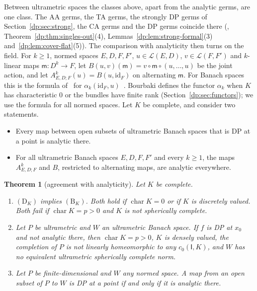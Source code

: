 \documentclass[11pt]{amsart}
\theoremstyle{definition}
\theoremstyle{remark}
\numberwithin{equation}{section}
\newcommand{\cL}{\mathcal L}
\newcommand{\id}{\mathrm{id}}
\theoremstyle{plain}
\newtheorem{introtheorem}{Theorem}
\theoremstyle{definition}
\theoremstyle{plain}
\begin{document}
Between ultrametric spaces the classes above, apart from the analytic germs, are one class. The AA germs, the TA germs, the strongly DP germs of Section~\ref{dp:sec:strong}, the CA germs and the DP germs coincide there (\cite[Theorem~14.39(1)]{I}, Theorem~\ref{dp:thm:singles-out}(4), Lemmas~\ref{dp:lem:strong-formal}(3) and~\ref{dp:lem:cover-flat}(5)). The comparison with analyticity then turns on the field. For $k\ge1$, normed spaces $E,D,F,F'$, $u\in\cL(E,D)$, $v\in\cL(F,F')$ and $k$-linear maps $\mathsf m\colon D^k\to F$, let $B(u,v)(\mathsf m)=v\circ\mathsf m\circ(u,\dots,u)$ be the joint action, and let $A^k_{E,D;F}(u)=B(u,\id_F)$ on alternating $\mathsf m$. For Banach spaces this is the formula of~\cite[n\textsuperscript{o}~7.8.1]{Bou} for $\alpha_k(\id_F,u)$~\cite[Section~10.2]{I}. Bourbaki defines the functor $\alpha_k$ when $K$ has characteristic $0$ or the bundles have finite rank (Section~\ref{dp:sec:functors}); we use the formula for all normed spaces. Let $K$ be complete, and consider two statements.
\begin{itemize}
\item[$(\mathrm D_K)$] Every map between open subsets of ultrametric Banach spaces that is DP at a point is analytic there.
\item[$(\mathrm B_K)$] For all ultrametric Banach spaces $E,D,F,F'$ and every $k\ge1$, the maps $A^k_{E,D;F}$ and $B$, restricted to alternating maps, are analytic everywhere.
\end{itemize}

\begin{introtheorem}[agreement with analyticity]\label{dp:intro:D}
Let $K$ be complete.
\begin{enumerate}
\item $(\mathrm D_K)$ implies $(\mathrm B_K)$. Both hold if $\operatorname{char}K=0$ or if $K$ is discretely valued. Both fail if $\operatorname{char}K=p>0$ and $K$ is not spherically complete.
\item Let $P$ be ultrametric and $W$ an ultrametric Banach space. If $f$ is DP at $x_0$ and not analytic there, then $\operatorname{char}K=p>0$, $K$ is densely valued, the completion of $P$ is not linearly homeomorphic to any $c_0(\mathsf I,K)$, and $W$ has no equivalent ultrametric spherically complete norm.
\item Let $P$ be finite-dimensional and $W$ any normed space. A map from an open subset of $P$ to $W$ is DP at a point if and only if it is analytic there.
\end{enumerate}
\end{introtheorem}
\end{document}
